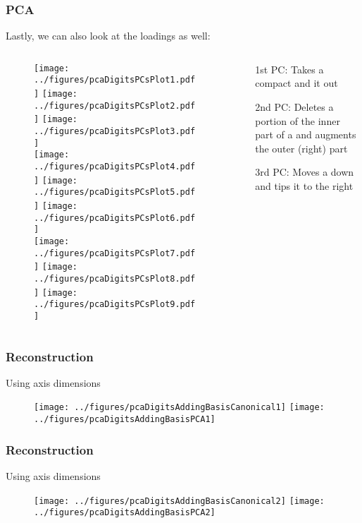 \documentclass[12pt]{beamer}
\begin{document}
\begin{frame}[fragile]
\frametitle{PCA}
Lastly, we can also look at the loadings as well:

\begin{columns}[T]
    \begin{column}{.63\textwidth}
\begin{figure}
\centering
\texttt{[image: ../figures/pcaDigitsPCsPlot1.pdf]}
\texttt{[image: ../figures/pcaDigitsPCsPlot2.pdf]}
\texttt{[image: ../figures/pcaDigitsPCsPlot3.pdf]}\\
\texttt{[image: ../figures/pcaDigitsPCsPlot4.pdf]}
\texttt{[image: ../figures/pcaDigitsPCsPlot5.pdf]}
\texttt{[image: ../figures/pcaDigitsPCsPlot6.pdf]}\\
\texttt{[image: ../figures/pcaDigitsPCsPlot7.pdf]}
\texttt{[image: ../figures/pcaDigitsPCsPlot8.pdf]}
\texttt{[image: ../figures/pcaDigitsPCsPlot9.pdf]}


\end{figure}    
\end{column}
    \begin{column}{.35\textwidth}
\vvvsp

\begin{itemize}
\item[1st PC:] Takes a compact  and  it out
\item[2nd PC:] Deletes a portion of the inner part of a  and augments the outer (right) part
\item[3rd PC:] Moves a  down and tips it to the right
\end{itemize}

\end{column}
\end{columns}
\end{frame}

\begin{frame}[fragile]
\frametitle{Reconstruction}
Using  axis dimensions
\begin{figure}
\centering
\texttt{[image: ../figures/pcaDigitsAddingBasisCanonical1]}
\texttt{[image: ../figures/pcaDigitsAddingBasisPCA1]}
\end{figure}
\end{frame}

\begin{frame}[fragile]
\frametitle{Reconstruction}
Using  axis dimensions
\begin{figure}
\centering
\texttt{[image: ../figures/pcaDigitsAddingBasisCanonical2]}
\texttt{[image: ../figures/pcaDigitsAddingBasisPCA2]}
\end{figure}
\end{frame}
\end{document}
